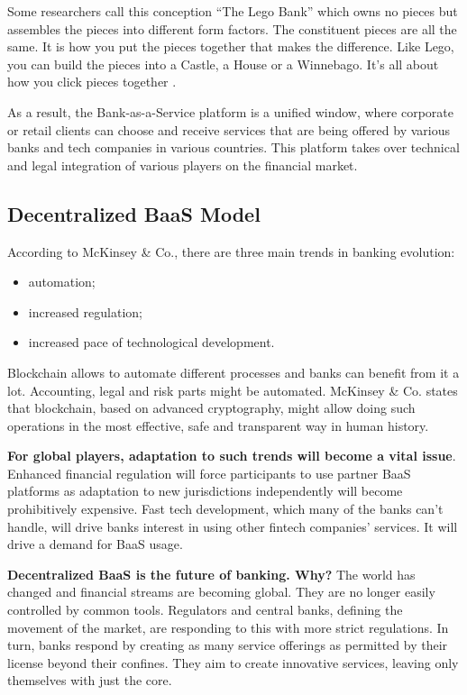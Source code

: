 \documentclass{article}
\begin{document}
\begin{multicols}{2}
Some researchers call this conception \enquote{The Lego Bank} which owns no pieces but assembles the pieces into different form factors.  The constituent pieces are all the same.  It is how you put the pieces together that makes the difference.  Like Lego, you can build the pieces into a Castle, a House or a Winnebago.  It’s all about how you click pieces together \cite{skinner2017baas}.

As a result, the Bank-as-a-Service platform is a unified window, where corporate or retail clients can choose and receive services that are being offered by various banks and tech companies in various countries. This platform takes over technical and legal integration of various players on the financial market.

\subsection{Decentralized BaaS Model}

According to McKinsey \& Co., there are three main trends in banking evolution:

\begin{itemize}
\item automation;
\item increased regulation;
\item increased pace of technological development.
\end{itemize}

Blockchain allows to automate different processes and banks can benefit from it a lot. Accounting, legal and risk parts might be automated. McKinsey \& Co. states that blockchain, based on advanced cryptography, might allow doing such operations in the most effective, safe and transparent way in human history.

\textbf{For global players, adaptation to such trends will become a vital issue}. Enhanced financial regulation will force participants  to use partner BaaS platforms as adaptation to new jurisdictions independently will become prohibitively expensive. Fast tech development,  which many of the banks can’t handle, will drive banks interest in using other fintech companies’ services. It will drive a demand for BaaS usage.

\textbf{Decentralized BaaS is the future of banking. Why?} The world has changed and financial streams are becoming global. They are no longer easily controlled by common tools. Regulators and central banks, defining the movement of the market, are responding to this with more strict regulations. In turn, banks respond by creating as many service offerings as permitted by their license beyond their confines. They aim to create innovative services, leaving only themselves with just the core.


\end{multicols}
\end{document}
